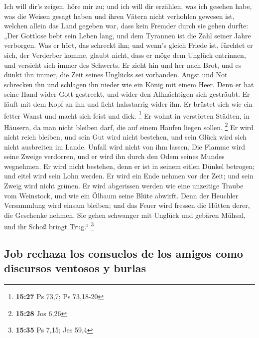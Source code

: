  Ich will dir's zeigen, höre mir zu; und ich will dir
erzählen, was ich gesehen habe,  was die Weisen gesagt
haben und ihren Vätern nicht verhohlen gewesen ist, 
welchen allein das Land gegeben war, dass kein Fremder durch sie gehen
durfte:  „Der Gottlose bebt sein Leben lang, und dem
Tyrannen ist die Zahl seiner Jahre verborgen.  Was er
hört, das schreckt ihn; und wenn's gleich Friede ist, fürchtet er sich,
der Verderber komme,  glaubt nicht, dass er möge dem
Unglück entrinnen, und versieht sich immer des Schwerts. 
Er zieht hin und her nach Brot, und es dünkt ihn immer, die Zeit seines
Unglücks sei vorhanden.  Angst und Not schrecken ihn und
schlagen ihn nieder wie ein König mit einem Heer.  Denn
er hat seine Hand wider Gott gestreckt, und wider den Allmächtigen sich
gesträubt.  Er läuft mit dem Kopf an ihn und ficht
halsstarrig wider ihn.  Er brüstet sich wie ein fetter
Wanst und macht sich feist und dick. \footnote{\textbf{15:27} Ps 73,7;
  Ps 73,18-20}  Er wohnt in verstörten Städten, in
Häusern, da man nicht bleiben darf, die auf einem Haufen liegen sollen.
\footnote{\textbf{15:28} Jos 6,26}  Er wird nicht reich
bleiben, und sein Gut wird nicht bestehen, und sein Glück wird sich
nicht ausbreiten im Lande.  Unfall wird nicht von ihm
lassen. Die Flamme wird seine Zweige verdorren, und er wird ihn durch
den Odem seines Mundes wegnehmen.  Er wird nicht
bestehen, denn er ist in seinem eitlen Dünkel betrogen; und eitel wird
sein Lohn werden.  Er wird ein Ende nehmen vor der Zeit;
und sein Zweig wird nicht grünen.  Er wird abgerissen
werden wie eine unzeitige Traube vom Weinstock, und wie ein Ölbaum seine
Blüte abwirft.  Denn der Heuchler Versammlung wird einsam
bleiben; und das Feuer wird fressen die Hütten derer, die Geschenke
nehmen.  Sie gehen schwanger mit Unglück und gebären
Mühsal, und ihr Schoß bringt Trug.`` \footnote{\textbf{15:35} Ps 7,15;
  Jes 59,4}

\hypertarget{job-rechaza-los-consuelos-de-los-amigos-como-discursos-ventosos-y-burlas}{%
\subsection{Job rechaza los consuelos de los amigos como discursos
ventosos y
burlas}\label{job-rechaza-los-consuelos-de-los-amigos-como-discursos-ventosos-y-burlas}}

